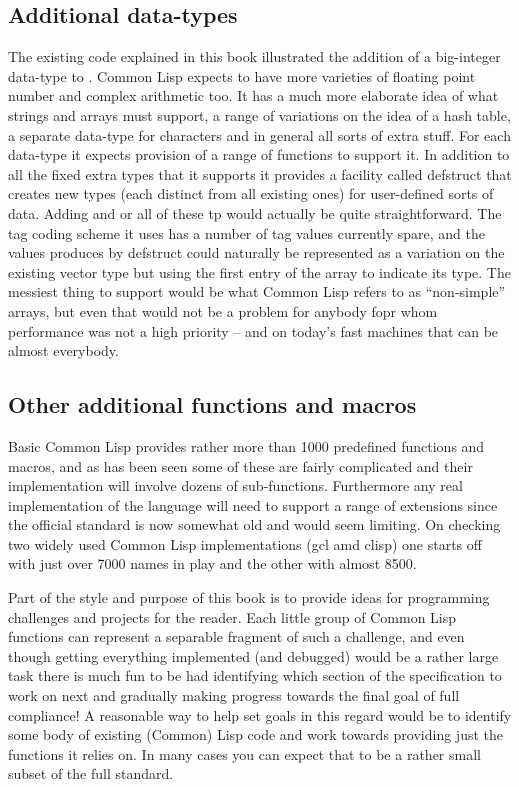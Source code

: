 \subsection{Additional data-types}
The existing code explained in this book illustrated the addition of
a big-integer data-type to \vsl. Common Lisp expects to have more varieties
of floating point number and complex arithmetic too. It has a much more
elaborate idea of what strings and arrays must support, a range of variations
on the idea of a hash table, a separate data-type for characters and
in general all sorts of extra stuff. For each data-type it expects provision
of a range of functions to support it. In addition to all the fixed extra
types that it supports it provides a facility called {\tx defstruct} that
creates new types (each distinct from all existing ones) for user-defined
sorts of data. Adding and or all of these tp \vsl{} would actually be quite
straightforward. The tag coding scheme it uses has a number of tag values
currently spare, and the values produces by {\tx defstruct} could naturally
be represented as a variation on the existing vector type but using the
first entry of the array to indicate its type. The messiest thing to support
would be what Common Lisp refers to as ``non-simple'' arrays, but even that
would not be a problem for anybody fopr whom performance was not a high
priority -- and on today's fast machines that can be almost everybody.

\subsection{Other additional functions and macros}
Basic Common Lisp provides rather more than 1000 predefined functions and
macros, and as has been seen some of these are fairly complicated and their
implementation will involve dozens of sub-functions. Furthermore any real
implementation of the language will need to support a range of extensions
since the official standard is now somewhat old and would seem limiting.
On checking two widely used Common Lisp implementations (gcl\cite{gcl}
amd clisp\cite{clisp}) one starts off with just over 7000 names in play
and the other with almost 8500.

Part of the style and purpose of this book is to provide ideas for
programming challenges and projects for the reader. Each little group
of Common Lisp functions can represent a separable fragment of such
a challenge, and even though getting everything implemented (and debugged)
would be a rather large task there is much fun to be had identifying
which section of the specification to work on next and gradually making
progress towards the final goal of full compliance! A reasonable way to
help set goals in this regard would be to identify some body of existing
(Common) Lisp code and work towards providing just the functions it relies
on. In many cases you can expect that to be a rather small subset of the
full standard.


